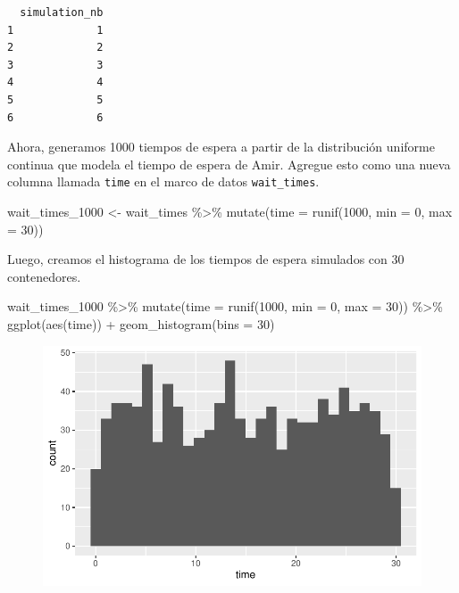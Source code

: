 \documentclass[
  letterpaper,
  DIV=11,
  numbers=noendperiod]{scrreprt}
\newenvironment{Shaded}{\begin{snugshade}}{\end{snugshade}}
\newcommand{\AttributeTok}[1]{\textcolor[rgb]{0.40,0.45,0.13}{#1}}
\newcommand{\DecValTok}[1]{\textcolor[rgb]{0.68,0.00,0.00}{#1}}
\newcommand{\FunctionTok}[1]{\textcolor[rgb]{0.28,0.35,0.67}{#1}}
\newcommand{\NormalTok}[1]{\textcolor[rgb]{0.00,0.23,0.31}{#1}}
\newcommand{\OtherTok}[1]{\textcolor[rgb]{0.00,0.23,0.31}{#1}}
\newcommand{\SpecialCharTok}[1]{\textcolor[rgb]{0.37,0.37,0.37}{#1}}
\begin{document}
\begin{verbatim}
  simulation_nb
1             1
2             2
3             3
4             4
5             5
6             6
\end{verbatim}

Ahora, generamos 1000 tiempos de espera a partir de la distribución
uniforme continua que modela el tiempo de espera de Amir. Agregue esto
como una nueva columna llamada \texttt{time} en el marco de datos
\texttt{wait\_times}.

\begin{Shaded}
\begin{Highlighting}[]
\NormalTok{wait\_times\_1000 }\OtherTok{\textless{}{-}}\NormalTok{ wait\_times }\SpecialCharTok{\%\textgreater{}\%}
  \FunctionTok{mutate}\NormalTok{(}\AttributeTok{time =} \FunctionTok{runif}\NormalTok{(}\DecValTok{1000}\NormalTok{, }\AttributeTok{min =} \DecValTok{0}\NormalTok{, }\AttributeTok{max =} \DecValTok{30}\NormalTok{))}
\end{Highlighting}
\end{Shaded}

Luego, creamos el histograma de los tiempos de espera simulados con 30
contenedores.

\begin{Shaded}
\begin{Highlighting}[]
\NormalTok{wait\_times\_1000 }\SpecialCharTok{\%\textgreater{}\%}
  \FunctionTok{mutate}\NormalTok{(}\AttributeTok{time =} \FunctionTok{runif}\NormalTok{(}\DecValTok{1000}\NormalTok{, }\AttributeTok{min =} \DecValTok{0}\NormalTok{, }\AttributeTok{max =} \DecValTok{30}\NormalTok{)) }\SpecialCharTok{\%\textgreater{}\%}
  \FunctionTok{ggplot}\NormalTok{(}\FunctionTok{aes}\NormalTok{(time)) }\SpecialCharTok{+}
  \FunctionTok{geom\_histogram}\NormalTok{(}\AttributeTok{bins =} \DecValTok{30}\NormalTok{)}
\end{Highlighting}
\end{Shaded}

\begin{figure}[H]

{\centering \includegraphics{summary_files/figure-pdf/unnamed-chunk-29-1.pdf}

}

\end{figure}
\end{document}
